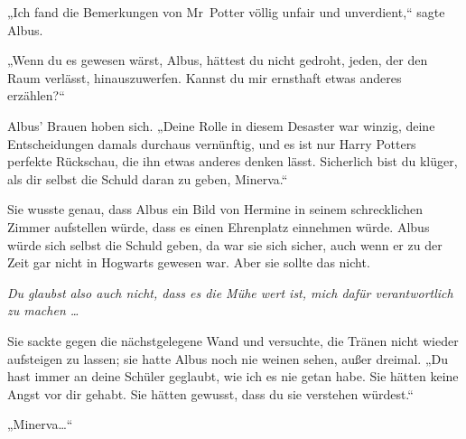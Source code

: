 „Ich fand die Bemerkungen von Mr~Potter völlig unfair und unverdient,“ sagte Albus.

„Wenn du es gewesen wärst, Albus, hättest du nicht gedroht, jeden, der den Raum verlässt, hinauszuwerfen. Kannst du mir ernsthaft etwas anderes erzählen?“

Albus' Brauen hoben sich.
„Deine Rolle in diesem Desaster war winzig, deine Entscheidungen damals durchaus vernünftig, und es ist nur Harry Potters perfekte Rückschau, die ihn etwas anderes denken lässt. Sicherlich bist du klüger, als dir selbst die Schuld daran zu geben, Minerva.“

Sie wusste genau, dass Albus ein Bild von Hermine in seinem schrecklichen Zimmer aufstellen würde, dass es einen Ehrenplatz einnehmen würde. Albus würde sich selbst die Schuld geben, da war sie sich sicher, auch wenn er zu der Zeit gar nicht in Hogwarts gewesen war. Aber sie sollte das nicht.

\emph{Du glaubst also auch nicht, dass es die Mühe wert ist, mich dafür verantwortlich zu machen …}

Sie sackte gegen die nächstgelegene Wand und versuchte, die Tränen nicht wieder aufsteigen zu lassen; sie hatte Albus noch nie weinen sehen, außer dreimal.
„Du hast immer an deine Schüler geglaubt, wie ich es nie getan habe. Sie hätten keine Angst vor dir gehabt. Sie hätten gewusst, dass du sie verstehen würdest.“

„Minerva…“

